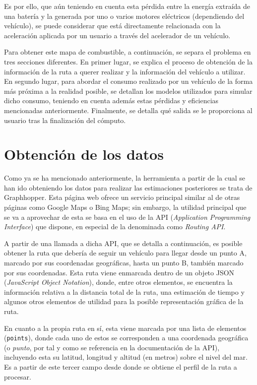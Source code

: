 \documentclass[11pt,spanish,listoffigures,listoftables]{tfgetsinf}
\begin{document}
Es por ello, que aún teniendo en cuenta esta pérdida entre la energía extraída de una batería y la generada por uno o varios motores eléctricos (dependiendo del vehículo), se puede considerar que está directamente relacionada con la aceleración aplicada por un usuario a través del acelerador de un vehículo.

Para obtener este mapa de combustible, a continuación, se separa el problema en tres secciones diferentes. En primer lugar, se explica el proceso de obtención de la información de la ruta a querer realizar y la información del vehículo a utilizar. En segundo lugar, para abordar el consumo realizado por un vehículo de la forma más próxima a la realidad posible, se detallan los modelos utilizados para simular dicho consumo, teniendo en cuenta además estas pérdidas y eficiencias mencionadas anteriormente. Finalmente, se detalla qué salida se le proporciona al usuario tras la finalización del cómputo.

\section{Obtención de los datos}
\label{obtencion_de_datos}
Como ya se ha mencionado anteriormente, la herramienta a partir de la cual se han ido obteniendo los datos para realizar las estimaciones posteriores se trata de Graphhopper. Esta página web ofrece un servicio principal similar al de otras páginas como Google Maps o Bing Maps; sin embargo, la utilidad principal que se va a aprovechar de esta se basa en el uso de la API (\textit{Application Programming Interface}) que dispone, en especial de la denominada como \textit{Routing API}.

A partir de una llamada a dicha API, que se detalla a continuación, es posible obtener la ruta que debería de seguir un vehículo para llegar desde un punto A, marcado por sus coordenadas geográficas, hasta un punto B, también marcado por sus coordenadas. Esta ruta viene enmarcada dentro de un objeto JSON (\textit{JavaScript Object Notation}), donde, entre otros elementos, se encuentra la información relativa a la distancia total de la ruta, una estimación de tiempo y algunos otros elementos de utilidad para la posible representación gráfica de la ruta.

En cuanto a la propia ruta en sí, esta viene marcada por una lista de elementos (\verb|points|), donde cada uno de estos se corresponden a una coordenada geográfica (o \textit{punto}, por tal y como se referencia en la documentación de la API), incluyendo esta su latitud, longitud y altitud (en metros) sobre el nivel del mar. Es a partir de este tercer campo desde donde se obtiene el perfil de la ruta a procesar.
\end{document}
